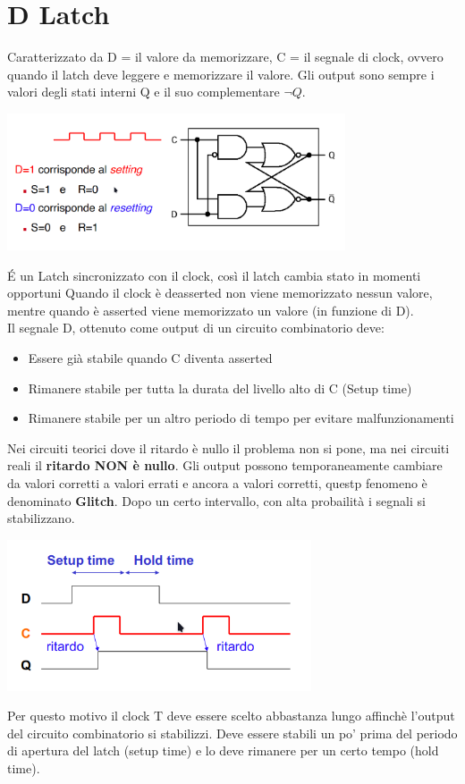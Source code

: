 \documentclass[12pt, a4paper, openany]{book}
\begin{document}
\section{D Latch}
Caratterizzato da D = il valore da memorizzare, C = il segnale di clock, ovvero quando
il latch deve leggere e memorizzare il valore. Gli output sono sempre i valori degli
stati interni Q e il suo complementare $\neg Q$.
\begin{center}
    \includegraphics[width=100mm, scale=0.5]{D-latch.png}
\end{center}
\'E un Latch sincronizzato con il clock, così il latch cambia stato in momenti opportuni
Quando il clock è deasserted non viene memorizzato nessun valore, mentre quando è
asserted viene memorizzato un valore (in funzione di D).
\\Il segnale D, ottenuto come output di un circuito combinatorio deve:
\begin{itemize}
    \item Essere già stabile quando C diventa asserted
    \item Rimanere stabile per tutta la durata del livello alto di C (Setup time)
    \item Rimanere stabile per un altro periodo di tempo per evitare malfunzionamenti
\end{itemize}
Nei circuiti teorici dove il ritardo è nullo il problema non si pone, ma nei circuiti
reali il \textbf{ritardo NON è nullo}.
Gli output possono temporaneamente cambiare da valori corretti a valori errati
e ancora a valori corretti, questp fenomeno è denominato \textbf{Glitch}.
Dopo un certo intervallo, con alta probailità i segnali si stabilizzano.
\begin{center}
    \includegraphics[width=90mm, scale=0.5]{glitch.png}
\end{center}
Per questo motivo il clock T deve essere scelto abbastanza lungo affinchè l'output
del circuito combinatorio si stabilizzi. Deve essere stabili un po' prima del periodo di apertura del
latch (setup time) e lo deve rimanere per un certo tempo (hold time).
\end{document}
